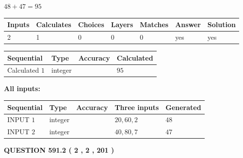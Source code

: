 \documentclass[12pt]{article}
\begin{document}
 

$ %
48 +  %
47=   %
95$
 
 
\noindent{}
 
 

 
   
   
   
   
\noindent\begin{tabular}{|l|l|l|l|l|l|l|}
 \hline
Inputs & Calculates & Choices & Layers & Matches & Answer & Solution \\ \hline
 2  & 
 1  & 
 0
  & 
 0  & 
 0  & 
  yes & 
  yes 
  \\ \hline
 \end{tabular}
   
   
   
   
\noindent{}
   
   
  
  
\noindent\begin{tabular}{|l|l|l|l|}
\hline
 Sequential & Type & Accuracy & Calculated \\ 
\hline
 
 
  Calculated $  1 $ & integer &  & 
  $ 95 $ 
 \\  \hline  
 \end{tabular}
   
   
   
   
\noindent\vspace{0.1in}\hspace{-0.08in} {\textbf{\Large{All inputs: }}}
   
   
  
  
\noindent\begin{tabular}{|l|l|l|l|l|}
\hline
 Sequential & Type & Accuracy & Three inputs & Generated \\ 
\hline
 
 
  INPUT $  1 $ & integer &  & $
 20
 , 
 60
 , 
 2
 $ & $ 48 $ 
 \\  \hline  
 
 
  INPUT $  2 $ & integer &  & $
 40
 , 
 80
 , 
 7
 $ & $ 47 $ 
 \\  \hline  
 \end{tabular}
   
   
  
\vspace{0.2in}
  
{\textbf{\Large{QUESTION
591.2 
 ( 2 , 2 , 201 )
}}}
  
\end{document}
